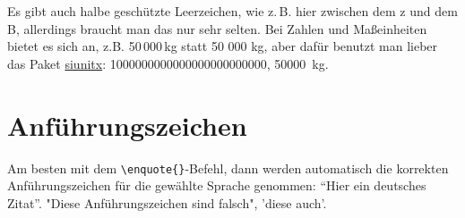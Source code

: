 Es gibt auch halbe geschützte Leerzeichen, wie z.\,B. hier zwischen dem z und dem B, allerdings braucht man das nur sehr selten. Bei Zahlen und Maßeinheiten bietet es sich an, z.B. 50\,000\,kg statt 50 000 kg, aber dafür benutzt man lieber das Paket \href{http://mirrors.ctan.org/macros/latex/contrib/siunitx/siunitx.pdf}{siunitx}: \num{1000000000000000000000000}, \SI{50000}{\kg}.

\section{Anführungszeichen}
Am besten mit dem \verb+\enquote{}+-Befehl, dann werden automatisch die korrekten Anführungszeichen für die gewählte Sprache genommen: \enquote{Hier ein deutsches Zitat}.
"Diese Anführungszeichen sind falsch", 'diese auch'.
